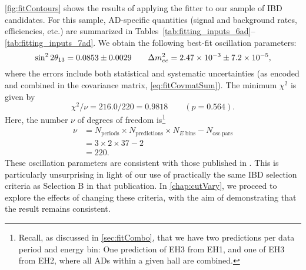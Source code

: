 \documentclass[../thesis.tex]{subfiles}
\begin{document}
\autoref{fig:fitContours} shows the results of applying the fitter to our sample of IBD candidates. For this sample, AD-specific quantities (signal and background rates, efficiencies, etc.) are summarized in Tables~\ref{tab:fitting_inputs_6ad}--\ref{tab:fitting_inputs_7ad}. We obtain the following best-fit oscillation parameters:
\begin{equation}
    \sin^2 2\theta_{13} = 0.0853 \pm 0.0029 \qquad \Delta m^2_{ee} = 2.47\times10^{-3} \pm 7.2\times10^{-5},
  \label{eq:fitResults}
\end{equation}
where the errors include both statistical and systematic uncertainties (as encoded and combined in the covariance matrix, \autoref{eq:fitCovmatSum}). The minimum $\chi^2$ is given by
\begin{equation}
  \chi^2 / \nu = 216.0 / 220 = 0.9818 \qquad (p = 0.564).
\end{equation}
Here, the number $\nu$ of degrees of freedom is\footnote{Recall, as discussed in \autoref{sec:fitCombo}, that we have two predictions per data period and energy bin: One prediction of EH3 from EH1, and one of EH3 from EH2, where all ADs within a given hall are combined.}
\begin{equation}
  \begin{aligned}
    \nu &= N_{\mathrm{periods}} \times N_{\mathrm{predictions}} \times N_{E\;\mathrm{bins}} - N_{\mathrm{osc\;pars}} \\
    &= 3 \times 2 \times 37 - 2 \\
    &= 220.
  \end{aligned}
\end{equation}
These oscillation parameters are consistent with those published in \cite{An_2017}. This is particularly unsurprising in light of our use of practically the same IBD selection criteria as Selection B in that publication. In \autoref{chap:cutVary}, we proceed to explore the effects of changing these criteria, with the aim of demonstrating that the result remains consistent.

\end{document}
